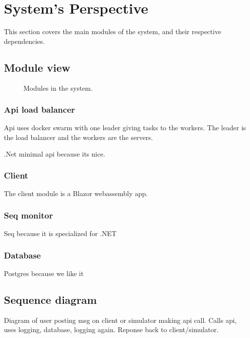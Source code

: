 \section{System's Perspective}
\label{ch:sys_persp} %

This section covers the main modules of the system, 
and their respective dependencies.

\subsection{Module view}



\begin{figure}[H]
    \centering
    \caption{Modules in the system.}
    \label{fig:modules}
\end{figure}

\subsubsection{Api load balancer}

Api uses docker swarm with one leader giving tasks 
to the workers. The leader is the load balancer 
and the workers are the servers. 

.Net minimal api because its nice.

\subsubsection{Client}

The client module is a Blazor webassembly app.

\subsubsection{Seq monitor}

Seq\cite{seq} because it is specialized for .NET

\subsubsection{Database}

Postgres because we like it


\subsection{Sequence diagram}

Diagram of user posting msg on client or simulator making api call. 
Calls api, uses logging, database, logging again. Reponse back to client/simulator.

\begin{figure}[H]
    \centering
    \caption{}
    \label{fig:sequence_diagram}
\end{figure}
